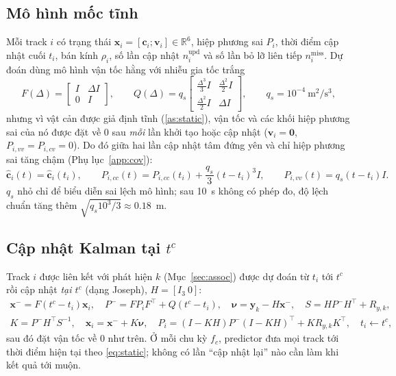 \documentclass[11pt,a4paper]{article}
\numberwithin{equation}{section}
\newcommand{\R}{\mathbb{R}}
\newcommand{\vb}[1]{\bm{#1}}
\newcommand{\T}{^{\!\top}}
\theoremstyle{definition}
\theoremstyle{plain}
\theoremstyle{remark}
\begin{document}
\subsection{Mô hình mốc tĩnh}
Mỗi track $i$ có trạng thái $\vb x_i=[\vb c_i;\vb v_i]\in\R^6$, hiệp phương sai $P_i$, thời điểm cập nhật cuối $t_i$, bán kính $\rho_i$, số lần cập nhật $n_i^{\text{upd}}$ và số lần bỏ lỡ liên tiếp $n_i^{\text{miss}}$. Dự đoán dùng mô hình vận tốc hằng với nhiễu gia tốc trắng
\begin{equation}
F(\Delta)=\begin{bmatrix}I&\Delta I\\0&I\end{bmatrix},\qquad
Q(\Delta)=q_s\begin{bmatrix}\tfrac{\Delta^3}{3}I&\tfrac{\Delta^2}{2}I\\ \tfrac{\Delta^2}{2}I&\Delta I\end{bmatrix},\qquad q_s=10^{-4}~\text{m}^2/\text{s}^3, \label{eq:cv}
\end{equation}
nhưng vì vật cản được giả định tĩnh (\ref{as:static}), vận tốc và các khối hiệp phương sai của nó được đặt về 0 sau \emph{mỗi} lần khởi tạo hoặc cập nhật ($\vb v_i=\vb 0$, $P_{i,vv}=P_{i,cv}=0$). Do đó giữa hai lần cập nhật tâm đứng yên và chỉ hiệp phương sai tăng chậm (Phụ lục~\ref{app:cov}):
\begin{equation}
\hat{\vb c}_i(t)=\hat{\vb c}_i(t_i),\qquad P_{i,cc}(t)=P_{i,cc}(t_i)+\frac{q_s}{3}(t-t_i)^3I,\qquad P_{i,vv}(t)=q_s(t-t_i)I. \label{eq:static}
\end{equation}
$q_s$ nhỏ chỉ để biểu diễn sai lệch mô hình; sau 10~s không có phép đo, độ lệch chuẩn tăng thêm $\sqrt{q_s10^3/3}\approx0.18$~m.

\subsection{Cập nhật Kalman tại $t^c$}
\label{sec:kf}
Track $i$ được liên kết với phát hiện $k$ (Mục~\ref{sec:assoc}) được dự đoán từ $t_i$ tới $t^c$ rồi cập nhật \emph{tại $t^c$} (dạng Joseph), $H=[I_3\ 0]$:
\begin{gather}
\vb x^-=F(t^c-t_i)\vb x_i,\quad P^-=F P_iF\T+Q(t^c-t_i),\quad
\bm\nu=\vb y_k-H\vb x^-,\quad S=HP^-H\T+R_{y,k}, \label{eq:kfpred}\\
K=P^-H\T S^{-1},\quad \vb x_i=\vb x^-+K\bm\nu,\quad P_i=(I-KH)P^-(I-KH)\T+KR_{y,k}K\T,\quad t_i\leftarrow t^c, \label{eq:kfupd}
\end{gather}
sau đó đặt vận tốc về 0 như trên. Ở mỗi chu kỳ $f_c$, predictor đưa mọi track tới thời điểm hiện tại theo \eqref{eq:static}; không có lần ``cập nhật lại'' nào cần làm khi kết quả tới muộn.
\end{document}
